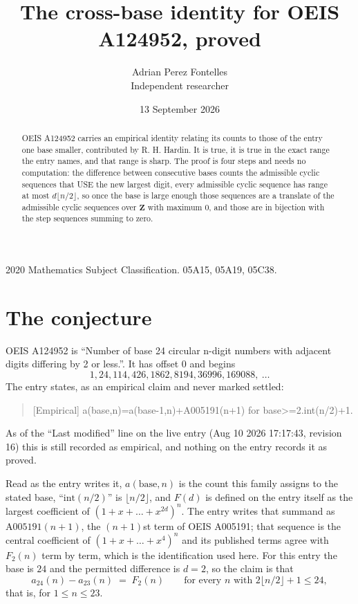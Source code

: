 \documentclass[11pt,a4paper]{article}
\title{The cross-base identity for OEIS A124952, proved}
\author{Adrian Perez Fontelles\\ \small Independent researcher}
\date{13 September 2026}
\theoremstyle{plain}
\theoremstyle{definition}
\begin{document}
\maketitle

\begin{abstract}
OEIS A124952 carries an empirical identity relating its counts to those of the entry one base
smaller, contributed by R. H. Hardin. It is true, it is true in the exact range the entry
names, and that range is sharp. The proof is four steps and needs no computation: the
difference between consecutive bases counts the admissible cyclic sequences that USE the new
largest digit, every admissible cyclic sequence has range at most $d\lfloor n/2\rfloor$, so
once the base is large enough those sequences are a translate of the admissible cyclic
sequences over $\mathbf{Z}$ with maximum $0$, and those are in bijection with the step
sequences summing to zero.
\end{abstract}

\noindent\small 2020 Mathematics Subject Classification. 05A15, 05A19, 05C38.\normalsize

\section{The conjecture}

OEIS A124952 is ``Number of base 24 circular n-digit numbers with adjacent digits differing by 2 or less.''. It has offset $0$ and begins
\[
1, 24, 114, 426, 1862, 8194, 36996, 169088,\ \dots
\]
The entry states, as an empirical claim and never marked settled:
\begin{quote}
[Empirical] a(base,n)=a(base-1,n)+A005191(n+1) for base>=2.int(n/2)+1.
\end{quote}
As of the ``Last modified'' line on the live entry (Aug 10 2026 17:17:43, revision 16)
this is still recorded as empirical, and nothing on the entry records it as proved.

Read as the entry writes it, $a(\mathrm{base},n)$ is the count this family assigns to the
stated base, ``$\mathrm{int}(n/2)$'' is $\lfloor n/2\rfloor$, and $F(d)$ is defined on the
entry itself as the largest coefficient of $(1+x+\dots+x^{2d})^{n}$. The entry writes that summand as $\mathrm{A005191}(n+1)$, the $(n+1)$st term of OEIS A005191; that sequence is the central coefficient of $(1+x+\dots+x^{4})^{n}$ and its published terms agree with $F_{2}(n)$ term by term, which is the identification used here. For this entry
the base is $24$ and the permitted difference is $d=2$, so the claim is that
\[
a_{24}(n)-a_{23}(n)\;=\;F_{2}(n)
\qquad\text{for every } n \text{ with } 2\lfloor n/2\rfloor+1\le24,
\]
that is, for $1\le n\le23$.
\end{document}
